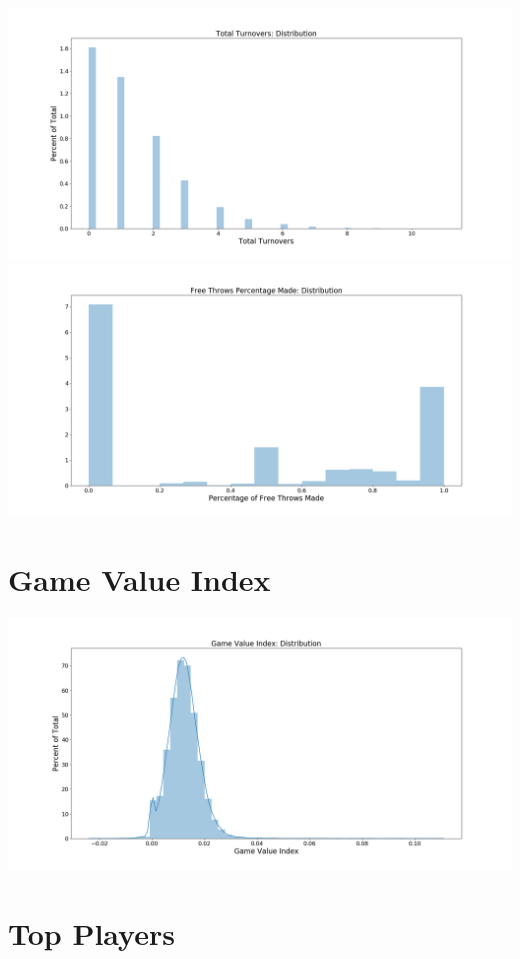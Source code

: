 \documentclass[12pt, authoryear]{elsarticle}
\begin{document}
\includegraphics[scale=0.3]{Turnovers_Distribution}\\
\includegraphics[scale=0.3]{Free_Throw_Percent_Distribution}\\

\section{Game Value Index} \label{game_value_dist}
\includegraphics[scale=0.3]{gamevalueIndex}\\

\section{Top Players}\label{top_players}
\end{document}
